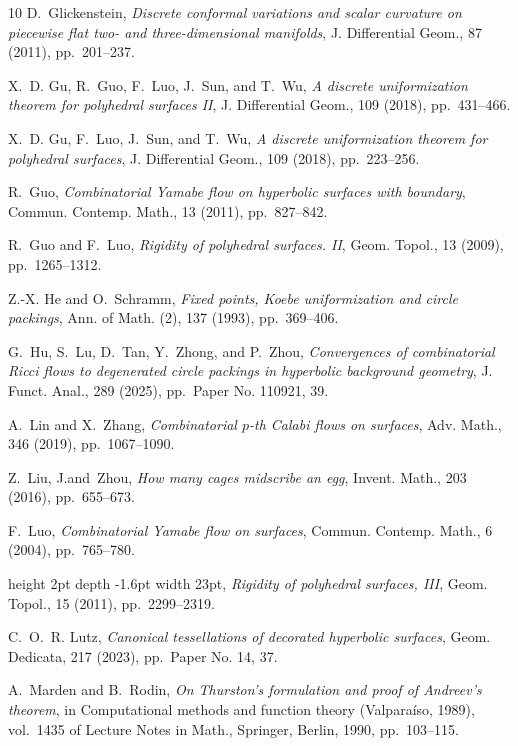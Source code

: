 \documentclass[11pt,leqno]{article}
\numberwithin{equation}{section}
\theoremstyle{definition}
\begin{document}
\begin{thebibliography}{10}
{\sc D.~Glickenstein}, {\em Discrete conformal variations and scalar curvature
  on piecewise flat two- and three-dimensional manifolds}, J. Differential
  Geom., 87 (2011), pp.~201--237.

{\sc X.~D. Gu, R.~Guo, F.~Luo, J.~Sun, and T.~Wu}, {\em A discrete
  uniformization theorem for polyhedral surfaces {II}}, J. Differential Geom.,
  109 (2018), pp.~431--466.

{\sc X.~D. Gu, F.~Luo, J.~Sun, and T.~Wu}, {\em A discrete uniformization
  theorem for polyhedral surfaces}, J. Differential Geom., 109 (2018),
  pp.~223--256.

{\sc R.~Guo}, {\em Combinatorial {Y}amabe flow on hyperbolic surfaces with
  boundary}, Commun. Contemp. Math., 13 (2011), pp.~827--842.

{\sc R.~Guo and F.~Luo}, {\em Rigidity of polyhedral surfaces. {II}}, Geom.
  Topol., 13 (2009), pp.~1265--1312.

{\sc Z.-X. He and O.~Schramm}, {\em Fixed points, {K}oebe uniformization and
  circle packings}, Ann. of Math. (2), 137 (1993), pp.~369--406.

{\sc G.~Hu, S.~Lu, D.~Tan, Y.~Zhong, and P.~Zhou}, {\em Convergences of
  combinatorial {R}icci flows to degenerated circle packings in hyperbolic
  background geometry}, J. Funct. Anal., 289 (2025), pp.~Paper No. 110921, 39.

{\sc A.~Lin and X.~Zhang}, {\em Combinatorial {$p$}-th {C}alabi flows on
  surfaces}, Adv. Math., 346 (2019), pp.~1067--1090.

{\sc Z.~Liu, J.and~Zhou}, {\em How many cages midscribe an egg}, Invent. Math.,
  203 (2016), pp.~655--673.

{\sc F.~Luo}, {\em Combinatorial {Y}amabe flow on surfaces}, Commun. Contemp.
  Math., 6 (2004), pp.~765--780.

\leavevmode\vrule height 2pt depth -1.6pt width 23pt, {\em Rigidity of
  polyhedral surfaces, {III}}, Geom. Topol., 15 (2011), pp.~2299--2319.

{\sc C.~O.~R. Lutz}, {\em Canonical tessellations of decorated hyperbolic
  surfaces}, Geom. Dedicata, 217 (2023), pp.~Paper No. 14, 37.

{\sc A.~Marden and B.~Rodin}, {\em On {T}hurston's formulation and proof of
  {A}ndreev's theorem}, in Computational methods and function theory
  ({V}alpara\'iso, 1989), vol.~1435 of Lecture Notes in Math., Springer,
  Berlin, 1990, pp.~103--115.


\end{thebibliography}
\end{document}
